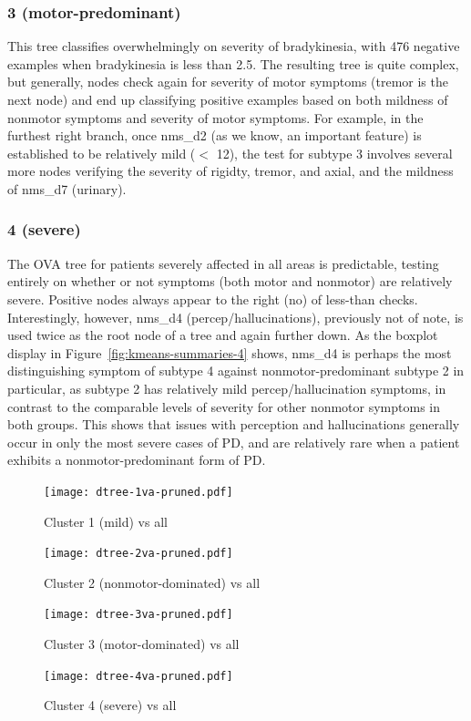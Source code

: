 \documentclass[10pt]{article}
\begin{document}
\begin{multicols}{2}

\subsubsection{3 (motor-predominant)}

This tree classifies overwhelmingly on severity of bradykinesia, with 476
negative examples when bradykinesia is less than 2.5. The resulting tree is
quite complex, but generally, nodes check again for severity of motor
symptoms (tremor is the next node) and end up classifying positive examples
based on both mildness of nonmotor symptoms and severity of motor symptoms. For
example, in the furthest right branch, once nms\_d2 (as we know, an important
feature) is established to be relatively mild ($<$ 12), the test for subtype 3
involves several more nodes verifying the severity of rigidty, tremor, and
axial, and the mildness of nms\_d7 (urinary).

\subsubsection{4 (severe)}

The OVA tree for patients severely affected in all areas is predictable, testing
entirely on whether or not symptoms (both motor and nonmotor) are relatively
severe. Positive nodes always appear to the right (no) of less-than checks.
Interestingly, however, nms\_d4 (percep/hallucinations), previously not of note, is used twice as the
root node of a tree and again further down. As the boxplot display in
Figure~\ref{fig:kmeans-summaries-4} shows, nms\_d4 is perhaps the most
distinguishing symptom of subtype 4 against nonmotor-predominant
subtype 2 in particular, as subtype 2 has relatively mild percep/hallucination
symptoms, in contrast to the comparable levels of severity for other nonmotor
symptoms in both groups. This shows that issues with perception and
hallucinations generally occur in only the most severe cases of PD, and are
relatively rare when a patient exhibits a nonmotor-predominant form of PD.

\begin{figure}[H]
  \centering
  \texttt{[image: dtree-1va-pruned.pdf]}
  \caption{Cluster 1 (mild) vs all}
  \label{fig:1va}
\end{figure}

\begin{figure}[H]
  \centering
  \texttt{[image: dtree-2va-pruned.pdf]}
  \caption{Cluster 2 (nonmotor-dominated) vs all}
  \label{fig:2va}
\end{figure}
\begin{figure}[H]
  \centering
  \texttt{[image: dtree-3va-pruned.pdf]}
  \caption{Cluster 3 (motor-dominated) vs all}
  \label{fig:3va}
\end{figure}
\begin{figure}[H]
  \centering
  \texttt{[image: dtree-4va-pruned.pdf]}
  \caption{Cluster 4 (severe) vs all}
  \label{fig:4va}
\end{figure}


\end{multicols}
\end{document}
